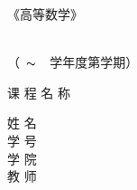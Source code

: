 \documentclass[a4paper,10pt]{article} %
\begin{document}
\begin{titlepage}
        
        \vspace*{34pt}
        \begin{center}
            \fontsize{44pt}{0} 《\quad 高\quad 等\quad 数\quad 学\quad 》\\
            \vspace*{36pt}\par
            \\
            \vspace*{48pt}
            \LARGE（\quad~$\thicksim$~\quad~学年度\quad \quad 第\quad 学期\quad）\\
            \vspace*{48pt}

            \LARGE 课\,\,程\,\,名\,\,称\ \ \underline{}\\
            \vspace*{72pt}

            \Large 姓\,\,名\ \ \underline{\makebox[168pt]{ }}\\\vskip 1.5cm
            \Large 学\,\,号\ \ \underline{\makebox[168pt]{}}\\\vskip 1.5cm
            \Large 学\,\,院\ \ \underline{\makebox[168pt]{}}\\\vskip 1.5cm
            \Large 教\,\,师\ \ \underline{\makebox[168pt]{ }}\\
        \end{center}
\end{titlepage}
\newpage
\end{document}
